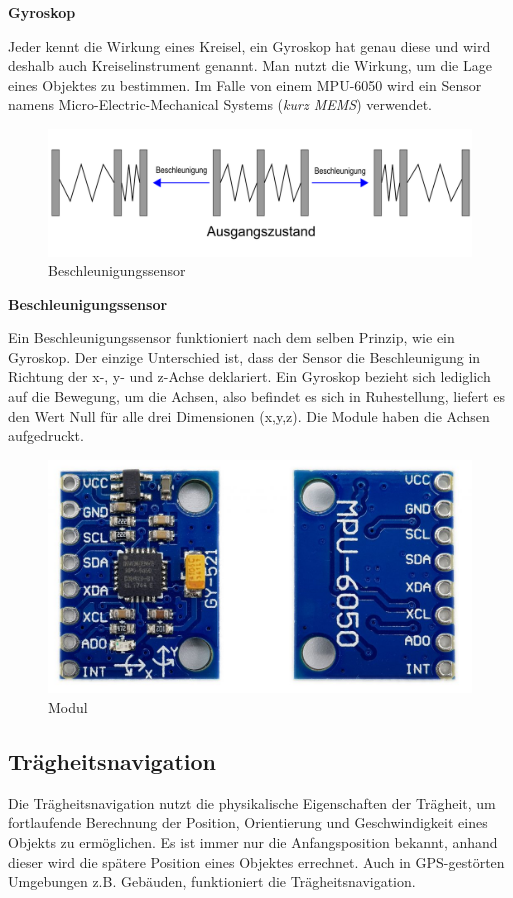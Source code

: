 \textbf{Gyroskop}

Jeder kennt die Wirkung eines Kreisel, ein Gyroskop hat genau diese und wird deshalb auch Kreiselinstrument genannt. Man nutzt die Wirkung, um die Lage eines Objektes zu bestimmen. Im Falle von einem MPU-6050 wird ein Sensor namens Micro-Electric-Mechanical Systems (\emph{kurz MEMS}) verwendet. 


\begin{figure}[H]
	\centering
	\includegraphics[width=0.7\linewidth]{images/Beschleunigungssensor.png}
	\caption[Beschleunigungssensor]{Beschleunigungssensor}
	\label{fig:Beschleunigungssensor}
\end{figure}

\textbf{Beschleunigungssensor}

Ein Beschleunigungssensor funktioniert nach dem selben Prinzip, wie ein Gyroskop. Der einzige Unterschied ist, dass der Sensor die Beschleunigung in Richtung der x-, y- und z-Achse deklariert. Ein Gyroskop bezieht sich lediglich auf die Bewegung, um die Achsen, also befindet es sich in Ruhestellung, liefert es den Wert Null für alle drei Dimensionen (x,y,z). \textcite{MPU6050} Die Module haben die Achsen aufgedruckt.

\begin{figure}[H]
	\centering
	\includegraphics[width=0.7\linewidth]{images/Modul.jpg}
	\caption[Modul]{Modul}
	\label{fig:Modul}
\end{figure}

\subsection{Trägheitsnavigation}

Die Trägheitsnavigation nutzt die physikalische Eigenschaften der Trägheit, um fortlaufende Berechnung der Position, Orientierung und Geschwindigkeit eines Objekts zu ermöglichen. \textcite{Traegheitsnavigation} Es ist immer nur die Anfangsposition bekannt, anhand dieser wird die spätere Position eines Objektes errechnet. Auch in GPS-gestörten Umgebungen z.B. Gebäuden, funktioniert die Trägheitsnavigation. 


